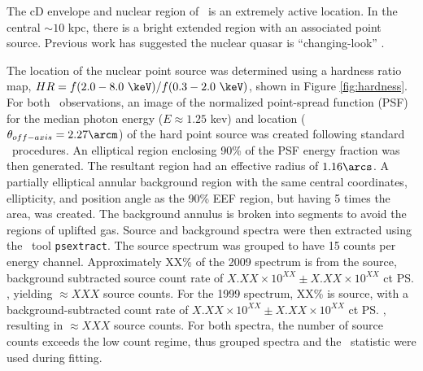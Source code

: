 \documentclass{emulateapj}
\begin{document}

The cD envelope and nuclear region of \iras\ is an extremely active
location. In the central $\sim10$ kpc, there is a bright extended
region with an associated point source. Previous work has suggested
the nuclear quasar is ``changing-look'' \citep{2003MNRAS.342..422M}.

The location of the nuclear point source was determined using a
hardness ratio map, $HR = f(2.0-8.0~\keV)/f(0.3-2.0~\keV)$, shown in
Figure \ref{fig:hardness}. For both \chandra\ observations, an image
of the normalized point-spread function (PSF) for the median photon
energy ($E \approx 1.25$ kev) and location ($\theta_{off-axis} =
2.27\arcm$) of the hard point source was created following standard
\ciao\ procedures. An elliptical region enclosing 90\% of the PSF
energy fraction was then generated. The resultant region had an
effective radius of $1.16\arcs$. A partially elliptical annular
background region with the same central coordinates, ellipticity, and
position angle as the 90\% EEF region, but having 5 times the area,
was created. The background annulus is broken into segments to avoid
the regions of uplifted gas. Source and background spectra were then
extracted using the \ciao\ tool {\tt psextract}. The source spectrum
was grouped to have 15 counts per energy channel. Approximately XX\%
of the 2009 spectrum is from the source, background subtracted source
count rate of $X.XX\times10^{XX} \pm X.XX\times10^{XX}$ ct \ps,
yielding $\approx XXX$ source counts. For the 1999 spectrum, XX\% is
source, with a background-subtracted count rate of $X.XX\times10^{XX}
\pm X.XX\times10^{XX}$ ct \ps, resulting in $\approx XXX$ source
counts. For both spectra, the number of source counts exceeds the low
count regime, thus grouped spectra and the \chisq\ statistic were used
during fitting.
\end{document}
